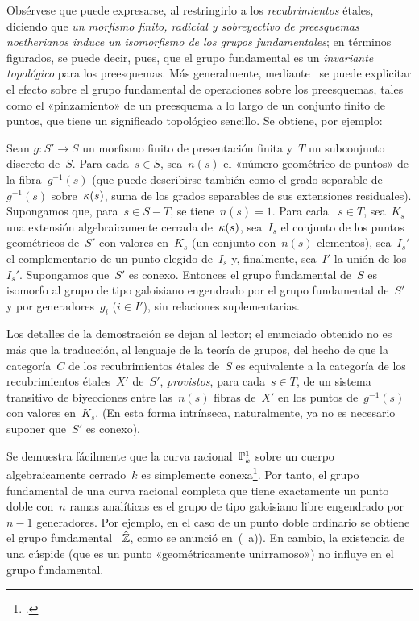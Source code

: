 Obsérvese que
puede expresarse, al restringirlo a los \emph{recubrimientos} étales,
diciendo que \emph{un morfismo finito, radicial y sobreyectivo de preesquemas
noetherianos induce un isomorfismo de los grupos fundamentales}; en términos
figurados, se puede decir, pues, que el grupo fundamental es un
\emph{invariante topológico} para los preesquemas.
Más generalmente, mediante~ se puede explicitar el efecto sobre
el grupo fundamental de operaciones sobre los preesquemas, tales como el
«pinzamiento» de un preesquema a lo largo de un conjunto finito de puntos,
que tiene un significado topológico sencillo. Se obtiene, por ejemplo:

\begin{corollaire}
\label{IX.5.4}
Sean $g\colon S'\to S$ un morfismo finito de presentación finita y~$T$ un
subconjunto discreto de~$S$. Para cada~$s\in S$, sea~$n(s)$ el «número geométrico de
puntos» de la fibra~$g^{-1}(s)$ (que puede describirse también como el grado
separable de~$g^{-1}(s)$ sobre~$\kappa(s)$, suma de los grados separables de sus
extensiones residuales). Supongamos que, para~$s\in S-T$, se tiene~$n(s)=1$. Para cada
~$s\in T$, sea~$K_s$ una extensión algebraicamente cerrada de~$\kappa(s)$,
sea~$I_s$ el conjunto de los puntos geométricos de~$S'$ con valores en~$K_s$
(un conjunto con~$n(s)$ elementos), sea~$I_s'$ el complementario de un punto
elegido de~$I_s$ y, finalmente, sea~$I'$ la unión de los~$I_s'$. Supongamos
que~$S'$ es conexo. Entonces el grupo fundamental de~$S$ es isomorfo al grupo
de tipo galoisiano engendrado por el grupo fundamental de~$S'$ y por
generadores~$g_i$ ($i\in I'$), sin relaciones suplementarias.
\end{corollaire}

Los
detalles de la demostración se dejan al lector; el enunciado obtenido no es
más que la traducción, al lenguaje de la teoría de grupos, del hecho de que la
categoría~$C$ de los recubrimientos étales de~$S$ es equivalente a la
categoría de los recubrimientos étales~$X'$ de~$S'$, \emph{provistos}, para
cada~$s\in T$, de un sistema transitivo de biyecciones entre las~$n(s)$ fibras
de~$X'$ en los puntos de~$g^{-1}(s)$ con valores en~$K_s$. (En esta forma
intrínseca, naturalmente, ya no es necesario suponer que~$S'$ es conexo).

\begin{exemple}
\label{IX.5.5}
Se demuestra fácilmente que la curva racional~$\mathbb P^1_k$ sobre un cuerpo
algebraicamente cerrado~$k$ es simplemente conexa\footnote{\Cf
{}.}. Por tanto, el grupo fundamental de una curva racional
completa que tiene exactamente un punto doble con~$n$ ramas analíticas es el
grupo de tipo galoisiano libre engendrado por~$n-1$ generadores. Por ejemplo,
en el caso de un punto doble ordinario se obtiene el grupo fundamental
~$\hat{\mathbb Z}$, como se anunció en~(~a)). En cambio, la existencia de
una cúspide (que es un punto «geométricamente unirramoso») no influye en el
grupo fundamental.
\end{exemple}

